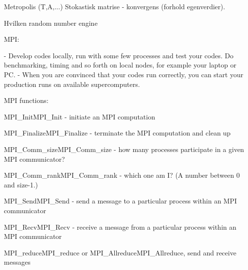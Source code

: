 
Metropolis (T,A,...)
	Stokastisk matrise  - konvergens (forhold egenverdier).
	
	Hvilken random number engine
	
MPI:	
	
- Develop codes locally, run with some few processes and test your codes. Do benchmarking, timing and so forth on local nodes, for example your laptop or PC.
- When you are convinced that your codes run correctly, you can start your production runs on available supercomputers.
	
	
MPI functions:

MPI_InitMPI_Init - initiate an MPI computation

MPI_FinalizeMPI_Finalize - terminate the MPI computation and clean up

MPI_Comm_sizeMPI_Comm_size - how many processes participate in a given MPI communicator?

MPI_Comm_rankMPI_Comm_rank - which one am I? (A number between 0 and size-1.)

MPI_SendMPI_Send - send a message to a particular process within an MPI communicator

MPI_RecvMPI_Recv - receive a message from a particular process within an MPI communicator

MPI_reduceMPI_reduce or MPI_AllreduceMPI_Allreduce, send and receive messages